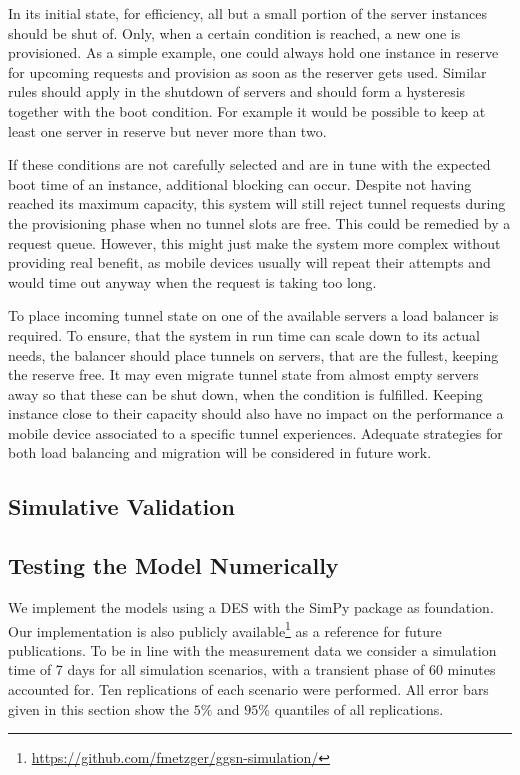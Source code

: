 In its initial state, for efficiency, all but a small portion of the server instances should be shut of. Only, when a certain condition is reached, a new one is provisioned. As a simple example, one could always hold one instance in reserve for upcoming requests and provision as soon as the reserver gets used. Similar rules should apply in the shutdown of servers and should form a hysteresis together with the boot condition. For example it would be possible to keep at least one server in reserve but never more than two.

If these conditions are not carefully selected and are in tune with the expected boot time of an instance, additional blocking can occur. Despite not having reached its maximum capacity, this system will still reject tunnel requests during the provisioning phase when no tunnel slots are free. This could be remedied by a request queue. However, this might just make the system more complex without providing real benefit, as mobile devices usually will repeat their attempts and would time out anyway when the request is taking too long. 

To place incoming tunnel state on one of the available servers a load balancer is required. To ensure, that the system in run time can scale down to its actual needs, the balancer should place tunnels on servers, that are the fullest, keeping the reserve free. It may even migrate tunnel state from almost empty servers away so that these can be shut down, when the condition is fulfilled. Keeping instance close to their capacity should also have no impact on the performance a mobile device associated to a specific tunnel experiences. Adequate strategies for both load balancing and migration will be considered in future work.




\subsection{Simulative Validation} 


\subsection{Testing the Model Numerically}
\label{c4:sec:model-numerical}

We implement the models using a \gls{DES} with the SimPy \cite{simpy} package as foundation. Our implementation is also publicly available\footnote{\url{https://github.com/fmetzger/ggsn-simulation/}} as a reference for future publications. To be in line with the measurement data we consider a simulation time of 7 days for all simulation scenarios, with a transient phase of 60 minutes accounted for. Ten replications of each scenario were performed. All error bars given in this section show the $5\%$ and $95\%$ quantiles of all replications.


